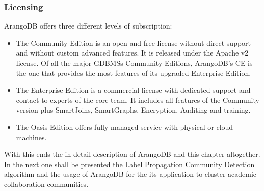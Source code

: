 \subsubsection{Licensing}\label{subsubsection:LiteratureReview/ReviewofGraphDatabaseSystems/AGDBMSindetailArangoDB/Licensing}
ArangoDB offers three different levels of subscription:
 \begin{itemize}[noitemsep]
	\item The Community Edition is an open and free license without direct support and without custom advanced features.
		  It is released under the Apache v2 license.
		  Of all the major GDBMSs Community Editions, ArangoDB's CE is the one that provides the most features of its upgraded Enterprise Edition.
	\item The Enterprise Edition is a commercial license with dedicated support and contact to experts of the core team.
		  It includes all features of the Community version plus SmartJoins, SmartGraphs, Encryption, Auditing and training.
	\item The Oasis Edition offers fully managed service with physical or cloud machines.
\end{itemize}

With this ends the in-detail description of ArangoDB and this chapter altogether.
In the next one shall be presented the Label Propagation Community Detection algorithm and the usage of ArangoDB for the its application to cluster academic collaboration communities.

\newpage
\thispagestyle{empty}
